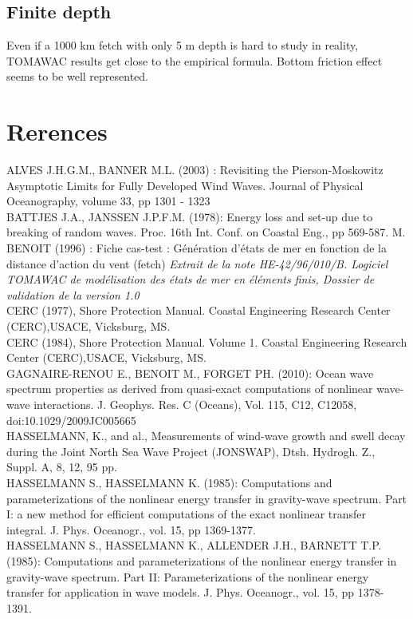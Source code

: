 \documentclass[10pt]{article}
\begin{document}
\subsection*{Finite depth}
Even if a 1000 km fetch with only 5 m depth is hard to study in reality, TOMAWAC results get close to the empirical formula. Bottom friction effect seems to be well represented.
\section*{Rerences}

ALVES J.H.G.M., BANNER M.L. (2003) : Revisiting the Pierson-Moskowitz Asymptotic Limits for Fully Developed Wind Waves. Journal of Physical Oceanography, volume 33, pp 1301 - 1323\\
 BATTJES J.A., JANSSEN J.P.F.M. (1978): Energy loss and set-up due to breaking of random waves. Proc.
16th Int. Conf. on Coastal Eng., pp 569-587.
 M. BENOIT (1996) : Fiche cas-test : G\'en\'eration d'\'etats de mer en fonction de la distance d'action du vent (fetch) \textit{Extrait de la note HE-42/96/010/B. Logiciel TOMAWAC de mod\'elisation des \'etats de mer en \'el\'ements finis, Dossier de validation de la version 1.0} \\
 CERC (1977), Shore Protection Manual. Coastal Engineering Research Center (CERC),USACE, Vicksburg, MS.\\
 CERC (1984), Shore Protection Manual. Volume 1. Coastal Engineering Research Center (CERC),USACE, Vicksburg, MS.\\
GAGNAIRE-RENOU E., BENOIT M., FORGET PH. (2010): Ocean wave spectrum properties as derived
from quasi-exact computations of nonlinear wave-wave interactions. J. Geophys. Res. C (Oceans),
Vol. 115, C12, C12058, doi:10.1029/2009JC005665\\
 HASSELMANN, K., and al., Measurements of wind-wave growth and swell decay during the Joint North Sea Wave Project (JONSWAP), Dtsh. Hydrogh. Z., Suppl. A, 8, 12, 95 pp.\\
HASSELMANN S., HASSELMANN K. (1985): Computations and parameterizations of the nonlinear energy
transfer in gravity-wave spectrum. Part I: a new method for efficient computations of the exact nonlinear
transfer integral. J. Phys. Oceanogr., vol. 15, pp 1369-1377.\\
HASSELMANN S., HASSELMANN K., ALLENDER J.H., BARNETT T.P. (1985): Computations and
parameterizations of the nonlinear energy transfer in gravity-wave spectrum. Part II: Parameterizations of
the nonlinear energy transfer for application in wave models. J. Phys. Oceanogr., vol. 15, pp 1378-1391.\\
\end{document}

